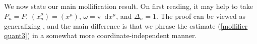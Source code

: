 \documentclass[reqno,10pt]{amsart}
\newcommand*\dif{\mathop{}\!\mathrm{d}}
\newtheorem{lemma}[theorem]{Lemma}
\theoremstyle{definition}
\numberwithin{equation}{section}
\begin{document}

We now state our main mollification result.
On first reading, it may help to take $P_n = P$, $(x^\mu_n) = (x^\mu)$, $\omega = \star \dif x^\mu$, and $\Delta_n = 1$.
The proof can be viewed as generalizing \cite[Lemma 7.5]{Giusti77}, and the main difference is that we phrase the estimate (\ref{mollifier quant3}) in a somewhat more coordinate-independent manner.
\end{document}
